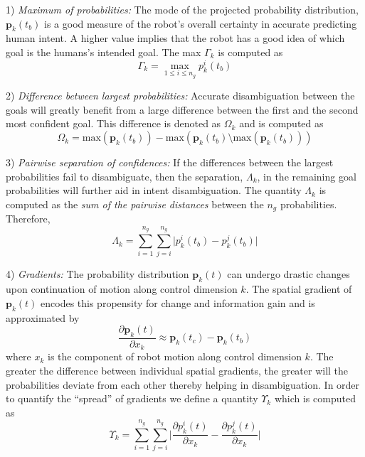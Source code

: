 1) \textit{Maximum of probabilities:} The mode of the projected probability distribution, $\boldsymbol{p}_k(t_b)$  is a good measure of the robot's overall certainty in accurate predicting human intent. A higher value implies that the robot has a good idea of which goal is the humans's intended goal. The max $\Gamma_k$ is computed as
\begin{equation*}
\Gamma_k = \max\limits_{1 \leq i \leq n_g}p^i_k(t_b)
\end{equation*}

2) \textit{Difference between largest probabilities:} Accurate disambiguation between the goals will greatly benefit from a large difference between the first and the second most confident goal. This difference is denoted as $\Omega_k$ and is computed as
\begin{equation*}
\Omega_k = \text{max}(\boldsymbol{p}_k(t_b)) - \text{max}(\boldsymbol{p}_k(t_b) \setminus \text{max}(\boldsymbol{p}_k(t_b)))
\end{equation*}

3) \textit{Pairwise separation of confidences:} If the differences between the largest probabilities fail to disambiguate, then the separation, $\Lambda_k$, in the remaining goal probabilities will further aid in intent disambiguation. The quantity $\Lambda_k$ is computed as the \textit{sum of the pairwise distances} between the $n_g$ probabilities. Therefore, 
\begin{equation*}
\Lambda_k = \sum_{i=1}^{n_g}\sum_{j=i}^{n_g}\lvert p^i_k(t_b) - p^j_k(t_b)\rvert
\end{equation*}

4) \textit{Gradients:} The probability distribution $\boldsymbol{p}_k(t)$ can undergo drastic changes upon continuation of motion along control dimension $k$. The spatial gradient of $\boldsymbol{p}_k(t)$ encodes this propensity for change and information gain and is approximated by 
\begin{equation*}
\frac{\partial\boldsymbol{p}_k(t)}{\partial x_k} \approx \boldsymbol{p}_k(t_c) - \boldsymbol{p}_k(t_b)
\end{equation*}
where $x_k$ is the component of robot motion along control dimension $k$. The greater the difference between individual spatial gradients, the greater will the probabilities deviate from each other thereby helping in disambiguation. In order to quantify the ``spread'' of gradients we define a quantity $\Upsilon_k$ which is computed as 
\begin{equation*}
\Upsilon_k = \sum_{i=1}^{n_g}\sum_{j=i}^{n_g}\Big \lvert\frac{\partial p^i_k(t)}{\partial x_k} - \frac{\partial p^j_k(t)}{\partial x_k}\Big \rvert
\end{equation*}

